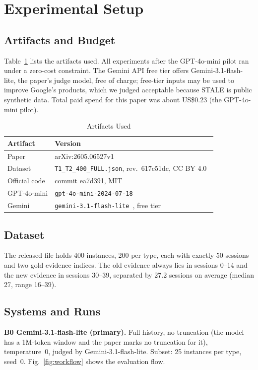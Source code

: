 \documentclass[conference]{IEEEtran}
\newcommand{\code}[1]{\texttt{\small #1}}
\begin{document}
\section{Experimental Setup}
\subsection{Artifacts and Budget}
Table~\ref{tab:artifacts} lists the artifacts used. All experiments after the GPT-4o-mini pilot ran under a zero-cost constraint. The Gemini API free tier offers Gemini-3.1-flash-lite, the paper's judge model, free of charge; free-tier inputs may be used to improve Google's products, which we judged acceptable because STALE is public synthetic data. Total paid spend for this paper was about US\$0.23 (the GPT-4o-mini pilot).

\begin{table}[t]
\caption{Artifacts Used}\label{tab:artifacts}
\centering\footnotesize\setlength{\tabcolsep}{4pt}
\begin{tabular}{@{}p{}p{}@{}}
\toprule
Artifact & Version \\
\midrule
Paper & arXiv:2605.06527v1~\cite{chao2026stale} \\
Dataset & \code{T1\_T2\_400\_FULL.json}, rev.\ 617c51dc, CC BY 4.0~\cite{stale_dataset} \\
Official code & commit ea7d391, MIT~\cite{stale_code} \\
GPT-4o-mini & \code{gpt-4o-mini-2024-07-18}~\cite{openai2024gpt4omini} \\
Gemini & \code{gemini-3.1-flash-lite}~\cite{google2026gemini31fl}, free tier \\
\bottomrule
\end{tabular}
\end{table}

\subsection{Dataset}
The released file holds 400 instances, 200 per type, each with exactly 50 sessions and two gold evidence indices. The old evidence always lies in sessions 0--14 and the new evidence in sessions 30--39, separated by 27.2 sessions on average (median 27, range 16--39).

\subsection{Systems and Runs}
\textbf{B0 Gemini-3.1-flash-lite (primary).} Full history, no truncation (the model has a 1M-token window and the paper marks no truncation for it), temperature~0, judged by Gemini-3.1-flash-lite. Subset: 25 instances per type, seed~0. Fig.~\ref{fig:workflow} shows the evaluation flow.
\end{document}
